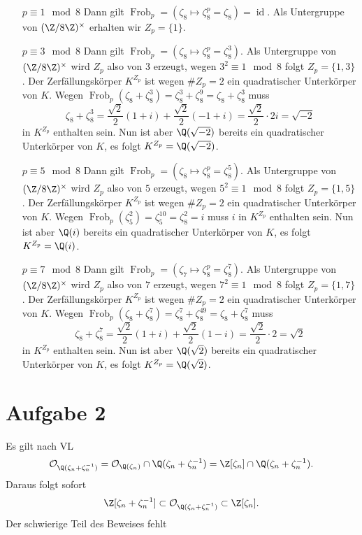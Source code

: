 \documentclass{article}
\begin{document}
\begin{enumerate}[(a)]
\begin{itemize}
        \item[$p \equiv 1 \mod 8$] Dann gilt $\operatorname{Frob}_p = (\zeta_8 \mapsto \zeta_8^p = \zeta_8) = \operatorname{id}$. Als Untergruppe von $(\Z/8\Z)^\times$ erhalten wir $Z_p = \{1\}$.
        \item[$p \equiv 3 \mod 8$] Dann gilt $\operatorname{Frob}_p = (\zeta_8 \mapsto \zeta_8^p = \zeta_8^3)$. Als Untergruppe von $(\Z/8\Z)^\times$ wird $Z_p$ also von $3$ erzeugt, wegen $3^2 \equiv 1 \mod 8$ folgt $Z_p = \{1, 3\}$.
        Der Zerfällungskörper $K^{Z_p}$ ist wegen $\# Z_p = 2$ ein quadratischer Unterkörper von $K$. Wegen $\operatorname{Frob}_p(\zeta_8 + \zeta_8^3) = \zeta_8^3 + \zeta_8^9 = \zeta_8 + \zeta_8^3$ muss 
        $$\zeta_8 + \zeta_8^3 = \frac{\sqrt{2}}{2}(1 + i) + \frac{\sqrt{2}}{2}(-1 + i) = \frac{\sqrt{2}}{2} \cdot 2i = \sqrt{-2}$$
        in $K^{Z_p}$ enthalten sein. Nun ist aber $\Q(\sqrt{-2})$ bereits ein quadratischer Unterkörper von $K$, es folgt $K^{Z_p} = \Q(\sqrt{-2})$.
        \item[$p \equiv 5 \mod 8$] Dann gilt $\operatorname{Frob}_p = (\zeta_8 \mapsto \zeta_8^p = \zeta_8^5)$. Als Untergruppe von $(\Z/8\Z)^\times$ wird $Z_p$ also von $5$ erzeugt, wegen $5^2 \equiv 1 \mod 8$ folgt $Z_p = \{1, 5\}$.
        Der Zerfällungskörper $K^{Z_p}$ ist wegen $\# Z_p = 2$ ein quadratischer Unterkörper von $K$. Wegen $\operatorname{Frob}_p(\zeta_5^2) = \zeta_5^{10} = \zeta_8^2 = i$ muss $i$ in $K^{Z_p}$ enthalten sein. Nun ist aber $\Q(i)$ bereits ein quadratischer Unterkörper von $K$, es folgt $K^{Z_p} = \Q(i)$.
        \item[$p \equiv 7 \mod 8$] Dann gilt $\operatorname{Frob}_p = (\zeta_7 \mapsto \zeta_8^p = \zeta_8^7)$. Als Untergruppe von $(\Z/8\Z)^\times$ wird $Z_p$ also von $7$ erzeugt, wegen $7^2 \equiv 1 \mod 8$ folgt $Z_p = \{1, 7\}$.
        Der Zerfällungskörper $K^{Z_p}$ ist wegen $\# Z_p = 2$ ein quadratischer Unterkörper von $K$. Wegen $\operatorname{Frob}_p(\zeta_8 + \zeta_8^7) = \zeta_8^7 + \zeta_8^{49} = \zeta_8 + \zeta_8^7$ muss 
        $$\zeta_8 + \zeta_8^7 = \frac{\sqrt{2}}{2}(1 + i) + \frac{\sqrt{2}}{2}(1 - i) = \frac{\sqrt{2}}{2} \cdot 2 = \sqrt{2}$$
        in $K^{Z_p}$ enthalten sein. Nun ist aber $\Q(\sqrt{2})$ bereits ein quadratischer Unterkörper von $K$, es folgt $K^{Z_p} = \Q(\sqrt{2})$.
    \end{itemize}
\section*{Aufgabe 2}
Es gilt nach VL $$\mathcal{O}_{\Q(\zeta_n + \zeta_n^{-1})} = \mathcal{O}_{\Q(\zeta_n)} \cap \Q(\zeta_n + \zeta_n^{-1}) = \Z[\zeta_n] \cap \Q(\zeta_n + \zeta_n^{-1}).$$ Daraus folgt sofort
 $$\Z[\zeta_n + \zeta_n^{-1}] \subset \mathcal{O}_{\Q(\zeta_n + \zeta_n^{-1})} \subset \Z[\zeta_n].$$
 Der schwierige Teil des Beweises fehlt

\end{enumerate}
\end{document}
